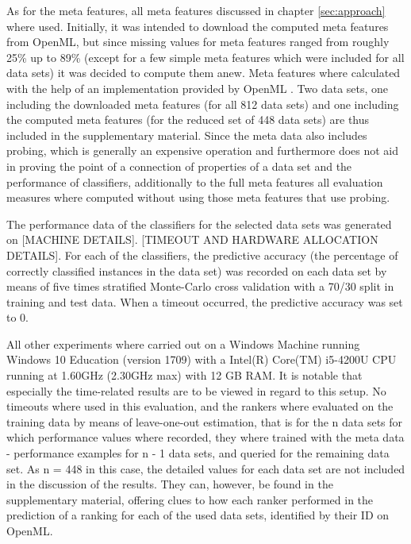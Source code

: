 
As for the meta features, all meta features discussed in chapter \ref{sec:approach} where used. Initially, it was intended to download the computed meta features from OpenML, but since missing values for meta features ranged from roughly 25\% up to 89\% (except for a few simple meta features which were included for all data sets) it was decided to compute them anew. Meta features where calculated with the help of an implementation provided by OpenML \cite{openMLEvaluationEngine}. Two data sets, one including the downloaded meta features (for all 812 data sets) and one including the computed meta features (for the reduced set of 448 data sets) are thus included in the supplementary material. Since the meta data also includes probing, which is generally an expensive operation and furthermore does not aid in proving the point of a connection of properties of a data set and the performance of classifiers, additionally to the full meta features all evaluation measures where computed without using those meta features that use probing.

The performance data of the classifiers for the selected data sets was generated on [MACHINE DETAILS]. [TIMEOUT AND HARDWARE ALLOCATION DETAILS]. For each of the classifiers, the predictive accuracy (the percentage of correctly classified instances in the data set) was recorded on each data set by means of five times stratified Monte-Carlo cross validation with a 70/30 split in training and test data. When a timeout occurred, the predictive accuracy was set to 0.

All other experiments where carried out on a Windows Machine running Windows 10 Education (version 1709) with a Intel(R) Core(TM) i5-4200U CPU running at 1.60GHz (2.30GHz max) with 12 GB RAM. It is notable that especially the time-related results are to be viewed in regard to this setup. No timeouts where used in this evaluation, and the rankers where evaluated on the training data by means of leave-one-out estimation, that is for the n data sets for which performance values where recorded, they where trained with the meta data - performance examples for n - 1 data sets, and queried for the remaining data set. As n = 448 in this case, the detailed values for each data set are not included in the discussion of the results. They can, however, be found in the supplementary material, offering clues to how each ranker performed in the prediction of a ranking for each of the used data sets, identified by their ID on OpenML. 

